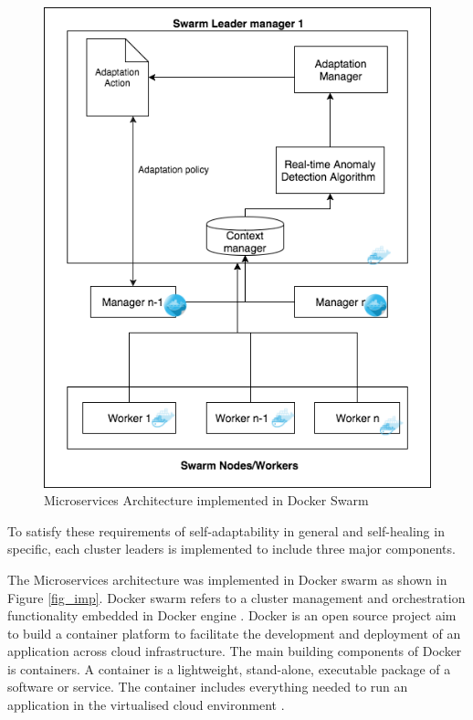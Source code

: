 \documentclass[sigconf]{acmart}
\begin{document}
\begin{figure}[ht] 
\includegraphics[scale=0.42]{model}
\caption{Microservices Architecture implemented in Docker Swarm}
\label{fig_model}
\end{figure}

To satisfy these requirements of self-adaptability in general and self-healing in specific, each cluster leaders is implemented to include three major components. 

The Microservices architecture was implemented in Docker swarm \cite{docker_2017} as shown in Figure \ref{fig_imp}. Docker swarm refers to a cluster management and orchestration functionality embedded in Docker engine \cite{docker_2017}. Docker is an open source project aim to build a container platform to facilitate the development and deployment of an application across cloud infrastructure. The main building components of Docker is containers. A container is a lightweight, stand-alone, executable package of a software or service. The container includes everything needed to run an application in the virtualised cloud environment \cite{docker_2017}. 
\end{document}
